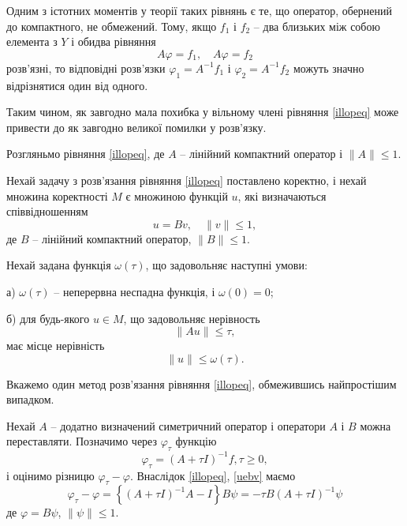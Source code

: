 \documentclass[14pt,twoside]{extreport}
\theoremstyle{mystyle}
\numberwithin{equation}{chapter}
\begin{document}
Одним з істотних моментів у теорії таких рівнянь є те, що оператор, обернений до компактного, не обмежений. Тому, якщо $f_1$ і $f_2$ -- два близьких між собою елемента з $Y$ і обидва рівняння
\[
 A \varphi = f_1, \quad A \varphi = f_2
\]
розв'язні, то відповідні розв'язки $\varphi_1 = A^{-1} f_1$ і $\varphi_2 = A^{-1} f_2$ можуть значно відрізнятися один від одного.

Таким чином, як завгодно мала похибка у вільному члені рівняння \eqref{illopeq} може привести до як завгодно великої помилки у розв'язку.


Розгляньмо рівняння \eqref{illopeq}, де $A$ -- лінійний компактний оператор і $\|A\| \leqslant 1$.

Нехай задачу з розв'язання рівняння \eqref{illopeq} поставлено коректно, і нехай множина коректності $M$ є множиною функцій $u$, які визначаються співвідношенням
\begin{equation}\label{uebv}
 u = Bv, \quad \|v\| \leqslant 1,
\end{equation}
де $B$ -- лінійний компактний оператор, $\|B\| \leqslant 1$.

Нехай задана функція $\omega(\tau)$, що задовольняє наступні умови:

а) $\omega(\tau)$ -- неперервна неспадна функція, і $\omega(0) = 0$;

б) для будь-якого $u \in M$, що задовольняє нерівность
\[
 \|Au\| \leqslant \tau,
\]
має місце нерівність
\begin{equation}\label{ineqfred1plpl}
 \|u\| \leqslant \omega(\tau).
\end{equation}

Вкажемо один метод розв'язання рівняння \eqref{illopeq}, обмежившись найпростішим випадком.

Нехай $A$ -- додатно визначений симетричний оператор і оператори $A$ і $B$ можна переставляти. Позначимо через $\varphi_{\tau}$ функцію
\[
 \varphi_{\tau} = (A + \tau I)^{-1} f, \tau\geqslant 0,
\]
і оцінимо різницю $\varphi_{\tau} - \varphi$. Внаслідок \eqref{illopeq}, \eqref{uebv} маємо
\begin{equation}
 \varphi_{\tau} - \varphi = \left\{(A + \tau I)^{-1} A - I\right\} B\psi = - \tau B(A+\tau I)^{-1} \psi
\end{equation}
де $\varphi = B \psi$, $\|\psi\| \leqslant 1$.
\end{document}
